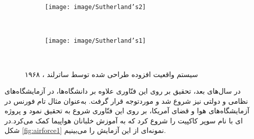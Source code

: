 \begin{figure}
	\centering
	\begin{subfigure}[b]{0.3\textwidth}
		\texttt{[image: image/Sutherland’s2]}
		
		\label{fig:gull}
	\end{subfigure}
	~ %
	\begin{subfigure}[b]{0.6\textwidth}
		\texttt{[image: image/Sutherland’s1]}
		
		\label{fig:tiger}
	\end{subfigure}
	~ %
	
	\caption{سیستم واقعیت افزوده طراحی شده توسط ساترلند ، ۱۹۶۸ \cite{Sutherland2}}\label{fig:Sutherland1968}
\end{figure}

در سال‌های بعد، تحقیق بر روی این فنّاوری علاوه بر دانشگاه‌ها، در آزمایشگاه‌های نظامی و دولتی نیز شروع شد و موردتوجه قرار گرفت. به‌عنوان‌ مثال تام فورنس در آزمایشگاه‌های هوا و قضای آمریکا، بر روی این فنّاوری شروع به تحقیق نمود و پروژه ای با نام سوپر کاکپیت را شروع کرد که به آموزش خلبانان هواپیما کمک می‌کرد\cite{Furness}.در شکل \ref{fig:airforce1} نمونه‌ای از این آزمایش را می‌بینیم.


